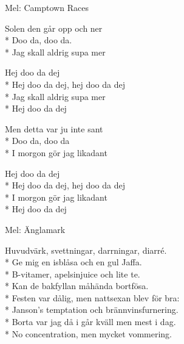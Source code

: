 \begin{SongText}[Solen]
    \begin{SongInfo}
        Mel: Camptown Races
    \end{SongInfo}
    \begin{SongVerse}
        Solen den går opp och ner\\*%
        Doo da, doo da.\\*%
        Jag skall aldrig supa mer
    \end{SongVerse}
    \begin{SongVerse}
        Hej doo da dej\\*%
        Hej doo da dej, hej doo da dej\\*%
        Jag skall aldrig supa mer\\*%
        Hej doo da dej
    \end{SongVerse}
    \begin{SongVerse}
        Men detta var ju inte sant\\*%
        Doo da, doo da\\*%
        I morgon gör jag likadant
    \end{SongVerse}
    \begin{SongVerse}
        Hej doo da dej\\*%
        Hej doo da dej, hej doo da dej\\*%
        I morgon gör jag likadant\\*%
        Hej doo da dej
    \end{SongVerse}
\end{SongText}
\begin{SongText}[Bakfyllesång]
    \begin{SongInfo}
        Mel: Änglamark
    \end{SongInfo}
    \begin{SongVerse}
        Huvudvärk, svettningar, darrningar, diarré.\\*%
        Ge mig en isblåsa och en gul Jaffa.\\*%
        B-vitamer, apelsinjuice och lite te.\\*%
        Kan de bakfyllan måhända bortfösa.\\*%
        Festen var dålig, men nattsexan blev för bra:\\*%
        Janson's temptation och brännvinsfurnering.\\*%
        Borta var jag då i går kväll men mest i dag.\\*%
        No concentration, men mycket vommering.
    \end{SongVerse}
\end{SongText}
